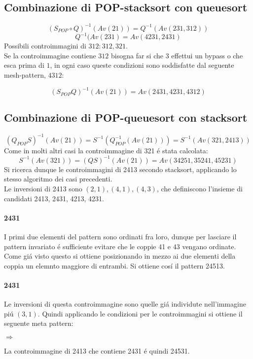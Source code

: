 \subsection*{Combinazione di {POP-stacksort} con {queuesort}}
$$(S_{POP}\circ{Q})^{-1}(Av(21))=Q^{-1}(Av(231,312))$$$$Q^{-1}(Av(231)=Av(4231,2431)$$
Possibili controimmagini di $312: 312, 321$.\\
Se la controimmagine contiene $312$ bisogna far si che $3$ effettui un bypass o che esca prima di $1$, in ogni caso queste condizioni sono soddisfatte dal seguente mesh-pattern, $4312$:
\begin{center}
\end{center}
$$(S_{POP}{Q})^{-1}(Av(21))=Av(2431,4231,4312)$$
\subsection*{Combinazione di {POP-queuesort} con {stacksort}}
$$(Q_{POP}{S})^{-1}(Av(21)) = S^{-1}(Q_{POP}^{-1}(Av(21))) = S^{-1}(Av(321, 2413))$$
Come in molti altri casi la controimmagine di 321 \'e stata calcolata:$$S^{-1}(Av(321)) = (QS)^{-1}(Av(21)) = Av(34251, 35241, 45231)$$
Si ricerca dunque le controimmagini di 2413 secondo stacksort, applicando lo stesso algoritmo dei casi precedenti.\\
Le inversioni di 2413 sono $(2,1),(4,1),(4,3)$, che definiscono l'insieme di candidati 2413, 2431, 4213, 4231.
\paragraph*{2431} I primi due elementi del pattern sono ordinati fra loro, dunque per lasciare il pattern invariato \'e sufficiente evitare che le coppie 41 e 43 vengano ordinate. Come gi\'a visto questo si ottiene posizionando in mezzo ai due elementi della coppia un elemnto maggiore di entrambi. Si ottiene cos\'i  il pattern 24513.
\paragraph*{2431} Le inversioni di questa controimmagine sono quelle gi\'a individute nell'immagine pi\'u $(3,1)$. Quindi applicando le condizioni per le controimmagini si ottiene il seguente meta pattern:
\begin{center}$\Rightarrow$\end{center}
La controimmagine di 2413 che contiene 2431 \'e quindi 24531.
